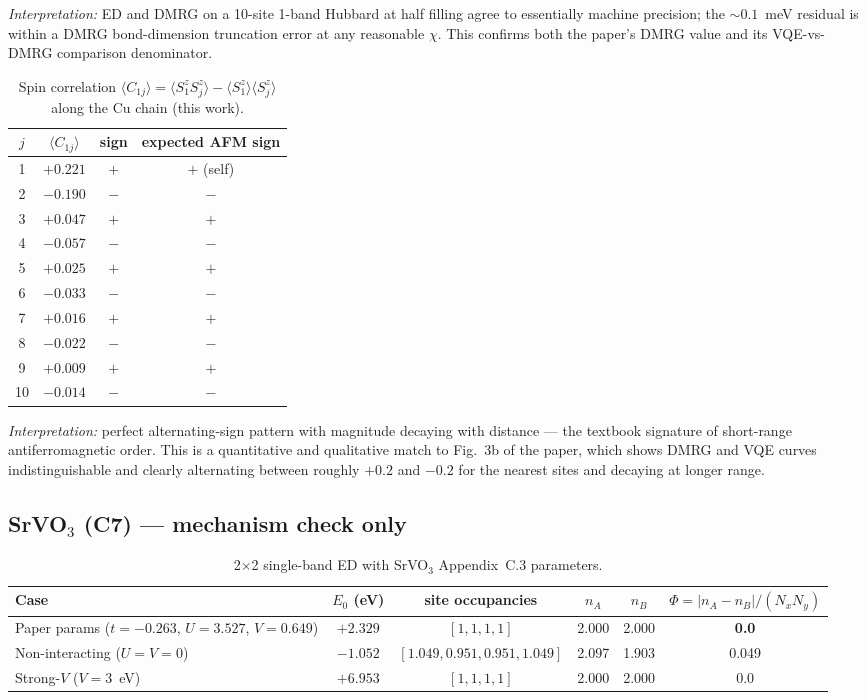 \documentclass[11pt]{article}
\begin{document}
\noindent \emph{Interpretation:} ED and DMRG on a 10-site 1-band Hubbard at half filling agree to essentially machine precision; the $\sim 0.1$~meV residual is within a DMRG bond-dimension truncation error at any reasonable $\chi$. This confirms both the paper's DMRG value and its VQE-vs-DMRG comparison denominator.

\begin{table}[h!]
\centering
\caption{Spin correlation $\langle C_{1j}\rangle = \langle S^z_1 S^z_j\rangle - \langle S^z_1\rangle\langle S^z_j\rangle$ along the Cu chain (this work).}
\begin{tabular}{cccc}
\toprule
$j$ & $\langle C_{1j}\rangle$ & sign & expected AFM sign \\
\midrule
1 & $+0.221$ & $+$ & $+$ (self) \\
2 & $-0.190$ & $-$ & $-$ \\
3 & $+0.047$ & $+$ & $+$ \\
4 & $-0.057$ & $-$ & $-$ \\
5 & $+0.025$ & $+$ & $+$ \\
6 & $-0.033$ & $-$ & $-$ \\
7 & $+0.016$ & $+$ & $+$ \\
8 & $-0.022$ & $-$ & $-$ \\
9 & $+0.009$ & $+$ & $+$ \\
10 & $-0.014$ & $-$ & $-$ \\
\bottomrule
\end{tabular}
\end{table}

\noindent \emph{Interpretation:} perfect alternating-sign pattern with magnitude decaying with distance --- the textbook signature of short-range antiferromagnetic order. This is a quantitative and qualitative match to Fig.~3b of the paper, which shows DMRG and VQE curves indistinguishable and clearly alternating between roughly $+0.2$ and $-0.2$ for the nearest sites and decaying at longer range.

\subsection{SrVO$_3$ (C7) --- mechanism check only}

\begin{table}[h!]
\centering
\caption{2$\times$2 single-band ED with SrVO$_3$ Appendix~C.3 parameters.}
\begin{tabular}{lccccc}
\toprule
Case & $E_0$ (eV) & site occupancies & $n_A$ & $n_B$ & $\Phi = |n_A-n_B|/(N_x N_y)$ \\
\midrule
Paper params ($t=-0.263$, $U=3.527$, $V=0.649$) & $+2.329$ & $[1,1,1,1]$ & 2.000 & 2.000 & \textbf{0.0} \\
Non-interacting ($U=V=0$) & $-1.052$ & $[1.049,0.951,0.951,1.049]$ & 2.097 & 1.903 & 0.049 \\
Strong-$V$ ($V=3$~eV) & $+6.953$ & $[1,1,1,1]$ & 2.000 & 2.000 & 0.0 \\
\bottomrule
\end{tabular}
\end{table}
\end{document}
